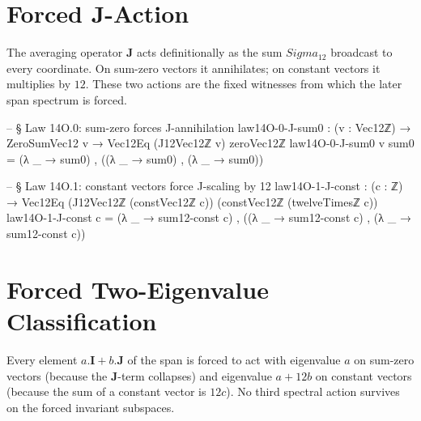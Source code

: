 \documentclass[11pt,a4paper]{book}
\def\Sigma{Sigma}%
\def\cdot{.}%
\begin{document}
\section{Forced J-Action}

The averaging operator $\mathbf{J}$ acts definitionally as
the sum $\Sigma_{12}$ broadcast to every coordinate.
On sum-zero vectors it annihilates; on constant vectors
it multiplies by $12$.  These two actions are the fixed witnesses from which
the later span spectrum is forced.

\begin{code}
-- § Law 14O.0: sum-zero forces J-annihilation
law14O-0-J-sum0 : (v : Vec12ℤ) → ZeroSumVec12 v → Vec12Eq (J12Vec12ℤ v) zeroVec12ℤ
law14O-0-J-sum0 v sum0 =
  (λ _ → sum0) , ((λ _ → sum0) , (λ _ → sum0))

-- § Law 14O.1: constant vectors force J-scaling by 12
law14O-1-J-const : (c : ℤ) → Vec12Eq (J12Vec12ℤ (constVec12ℤ c)) (constVec12ℤ (twelveTimesℤ c))
law14O-1-J-const c =
  (λ _ → sum12-const c) , ((λ _ → sum12-const c) , (λ _ → sum12-const c))
\end{code}


\section{Forced Two-Eigenvalue Classification}

Every element $a\!\cdot\!\mathbf{I}+b\!\cdot\!\mathbf{J}$ of the span
is forced to act with eigenvalue $a$ on sum-zero vectors
(because the $\mathbf{J}$-term collapses)
and eigenvalue $a+12b$ on constant vectors
(because the sum of a constant vector is $12c$).  No third spectral action
survives on the forced invariant subspaces.
\end{document}

